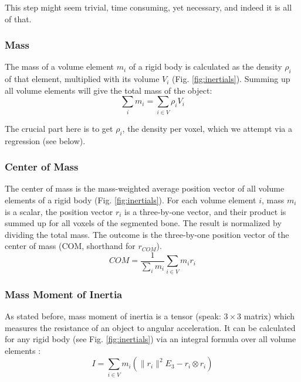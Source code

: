 This step might seem trivial, time consuming, yet necessary, and indeed it is all of that.


\subsubsection{Mass}
\label{sec:org6588391}
The mass of a volume element \(m_{i}\) of a rigid body is calculated as the density \(\rho_{i}\) of that element, multiplied with its volume \(V_{i}\) (Fig. \ref{fig:inertials}).
Summing up all volume elements will give the total mass of the object:
\begin{equation}\label{eqn:mass}
\sum_{i} m_{i} = \sum\limits_{i \in V} \rho_{i} V_{i}
\end{equation}

The crucial part here is to get \(\rho_{i}\), the density per voxel, which we attempt via a regression (see below).


\subsubsection{Center of Mass}
\label{sec:org14f3ce1}
The center of mass is the mass-weighted average position vector of all volume elements of a rigid body (Fig. \ref{fig:inertials}).
For each volume element \(i\), mass \(m_{i}\) is a scalar, the position vector \(r_{i}\) is a three-by-one vector, and their product is summed up for all voxels of the segmented bone.
The result is normalized by dividing the total mass.
The outcome is the three-by-one position vector of the center of mass (COM, shorthand for \(r_{COM}\)).
\begin{equation}\label{eqn:com}
 COM = \frac{1}{\sum_i m_{i}} \sum\limits_{i \in V} m_{i} r_{i}
\end{equation}


\subsubsection{Mass Moment of Inertia}
\label{sec:orge9ad22b}
As stated before, mass moment of inertia is a tensor (speak: \(3\times 3\) matrix) which measures the resistance of an object to angular acceleration.
It can be calculated for any rigid body (see Fig. \ref{fig:inertials}) via an integral formula over all volume elements \citep{WikipediaMOI}:
\begin{equation}\label{eqn:mmoi}
 I = \sum\limits_{i \in V} m_{i} \left( \lVert r_{i} \rVert^{2}E_3 - r_{i} \otimes r_{i} \right)
\end{equation}

